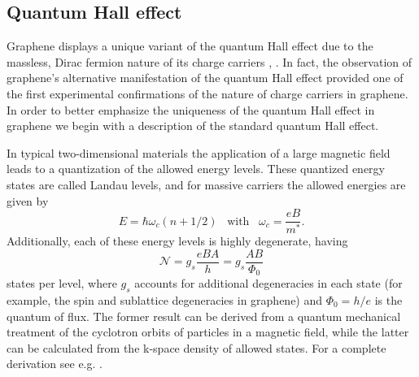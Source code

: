 \documentclass[edeposit,fullpage,draftthesis]{uiucthesis2009}
\begin{document}
    \subsection{Quantum Hall effect}
    	
        Graphene displays a unique variant of the quantum Hall effect due to the massless, 
        Dirac fermion nature of its charge carriers \cite{Novoselov2005}, \cite{Zhang2005}. In fact,
        the observation of graphene's alternative manifestation of the quantum Hall effect provided
        one of the first experimental confirmations of the nature of charge carriers in graphene.
        In order to better emphasize the uniqueness of the quantum Hall effect
        in graphene we begin with a description of the standard quantum Hall effect.
        
        In typical two-dimensional materials the application of a large magnetic 
        field leads to a quantization of the allowed energy levels. These quantized energy states are 
        called Landau levels, and for massive carriers the allowed energies are given by
        \begin{equation}
            E=\hbar \omega_c (n + 1/2) \;\;\; \text{with} \;\;\; \omega_c = \frac{e B}{m^*}.
        \end{equation}
        Additionally, each of these energy levels is highly degenerate, having
        \begin{equation}
            \mathcal{N} = g_s \frac{e B A}{h} = g_s \frac{A B}{\Phi_0}
            \label{eqn:ll_degeneracy}
        \end{equation}
        states per level, where $g_s$ accounts for additional degeneracies in each state (for example,
        the spin and sublattice degeneracies in graphene)
        and $\Phi_0 = h / e$ is the quantum of flux. 
        The former result 
        can be derived from a quantum mechanical treatment of the cyclotron orbits of particles in a magnetic field,
        while the latter can be calculated from the k-space density of allowed states. For a complete
        derivation see e.g. \cite{kittel1966introduction}.
        
\end{document}
